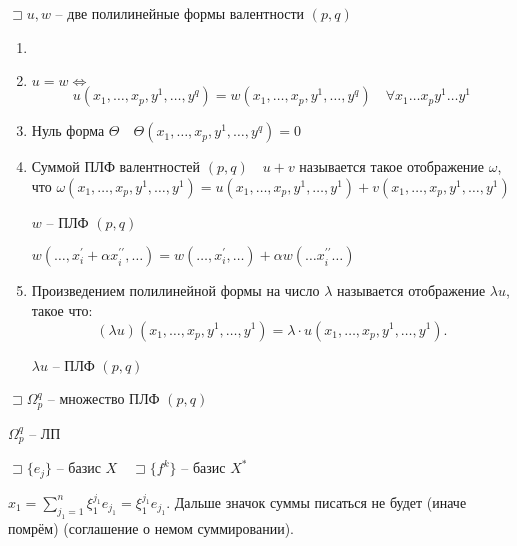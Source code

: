 \documentclass{book}
\newcommand{\p}[1]{#1^{\prime}}
\newcommand{\pp}[1]{#1^{\prime\prime}}
\theoremstyle{definition}
\begin{document}
    $\sqsupset u, w$ -- две полилинейные формы валентности $(p,q)$
     \begin{definition}
        \begin{enumerate}
            \item []
            \item $u=w \iff $ \[u(x_1, \ldots, x_p, y^1, \ldots, y^q) = w(x_1, \ldots, x_p, y^1, \ldots, y^q) \quad\forall x_1\ldots x_p y^1 \ldots y^1\] 
            \item Нуль форма $\Theta\quad \Theta\left( x_1, \ldots, x_p, y^1, \ldots, y^q \right)  = 0$
            \item Суммой ПЛФ валентностей $(p,q)\quad u+v$ называется такое отображение  $\omega$, что  $\omega(x_1, \ldots, x_p, y^1, \ldots, y^1) = u\left( x_1, \ldots, x_p, y^1, \ldots, y^1 \right) + v\left( x_1, \ldots, x_p, y^1, \ldots, y^1 \right)  $
                \begin{lemma}
                    $w$ -- ПЛФ  $(p,q)$

                    $w\left( \ldots ,\p x_i+\alpha \pp x_i, \ldots \right)  = w\left( \ldots ,\p x_i ,\ldots\right) +\alpha w\left( \ldots \pp x_i \ldots \right) $
                \end{lemma}
            \item Произведением полилинейной формы на число $\lambda$ называется отображение  $\lambda u$, такое что:  \[
                    (\lambda u)\left( x_1, \ldots, x_p, y^1, \ldots, y^1 \right)  = \lambda \cdot u\left( x_1, \ldots, x_p, y^1, \ldots, y^1 \right) 
            .\] 
                    \begin{lemma}
                        $\lambda u$ -- ПЛФ  $(p,q)$
                    \end{lemma}


        \end{enumerate}
    \end{definition}

    $\sqsupset \Omega_p^q$ -- множество ПЛФ $(p,q)$

     \begin{statement}
        $\Omega_p^q$ -- ЛП
    \end{statement}


    $\sqsupset \{e_j\}$ -- базис $X\quad \sqsupset \{f^k\}$ -- базис $X^*$

    $x_1 = \sum_{j_1=1}^{n} \xi_1^{j_1} e_{j_1} = \xi_1^{j_1}e_{j_1}$. Дальше значок суммы писаться не будет (иначе помрём) (соглашение о немом суммировании).
\end{document}
